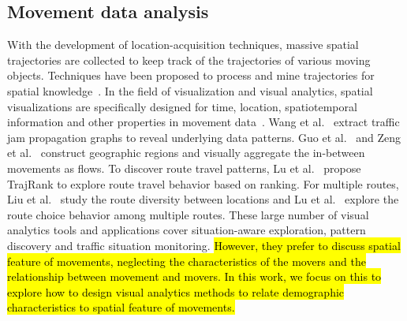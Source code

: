 \documentclass{ieeeaccess}
\begin{document}
\subsection{Movement data analysis}
With the development of location-acquisition techniques, massive spatial trajectories are collected to keep track of the trajectories of various moving objects. Techniques have been proposed to process and mine trajectories for spatial knowledge~\cite{Zheng2015_trajectory}. In the field of visualization and visual analytics, spatial visualizations are specifically designed for time, location, spatiotemporal information and other properties in movement data~\cite{chen2015survey}. Wang et al.~\cite{wang2013visual} extract traffic jam propagation graphs to reveal underlying data patterns. Guo et al.~\cite{guo2011tripvista} and Zeng et al.~\cite{zeng2013visualizing} construct geographic regions and visually aggregate the in-between movements as flows. To discover route travel patterns, Lu et al.~\cite{lu2015trajrank} propose TrajRank to explore route travel behavior based on ranking. For multiple routes, Liu et al.~\cite{liu2011_routediversity} study the route diversity between locations and Lu et al.~\cite{Lu2017_multipleroute} explore the route choice behavior among multiple routes. These large number of visual analytics tools and applications cover situation-aware exploration, pattern discovery and traffic situation monitoring. \hl{However, they prefer to discuss spatial feature of movements, neglecting the characteristics of the movers and the relationship between movement and movers. In this work, we focus on this to explore how to design visual analytics methods to relate demographic characteristics to spatial feature of movements.}
\end{document}
